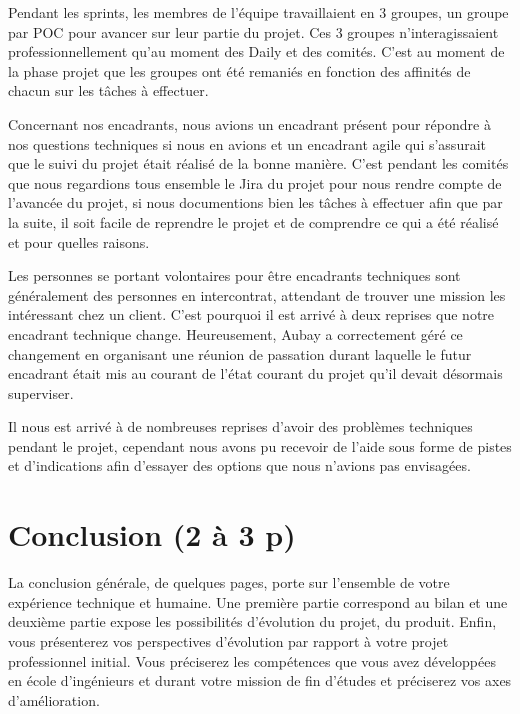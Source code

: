 \documentclass[11pt]{article}
\begin{document}
      Pendant les sprints, les membres de l'équipe travaillaient en 3 groupes, un groupe par POC pour avancer 
      sur leur partie du projet. Ces 3 groupes n'interagissaient professionnellement qu'au moment des Daily
      et des comités. C'est au moment de la phase projet que les groupes ont été remaniés en fonction des
      affinités de chacun sur les tâches à effectuer.

      Concernant nos encadrants, nous avions un encadrant présent pour répondre à nos questions 
      techniques si nous en avions et un encadrant agile qui s'assurait que le suivi du projet était réalisé 
      de la bonne manière. C'est pendant les comités que nous regardions tous ensemble le Jira du projet pour nous
      rendre compte de l'avancée du projet, si nous documentions bien les tâches à effectuer afin que par la suite, 
      il soit facile de reprendre le projet et de comprendre ce qui a été réalisé et pour quelles raisons.

      Les personnes se portant volontaires pour être encadrants techniques sont généralement des personnes en
      intercontrat, attendant de trouver une mission les intéressant chez un client. C'est pourquoi il est 
      arrivé à deux reprises que notre encadrant technique change. Heureusement, Aubay a correctement géré 
      ce changement en organisant une réunion de passation durant laquelle le futur encadrant était mis au 
      courant de l'état courant du projet qu'il devait désormais superviser.

      Il nous est arrivé à de nombreuses reprises d'avoir des problèmes techniques pendant le projet, cependant 
      nous avons pu recevoir de l'aide sous forme de pistes et d'indications afin d'essayer des options que 
      nous n'avions pas envisagées.

  \pagebreak
  \section{Conclusion (2 à 3 p)}
  La conclusion générale, de quelques pages, porte sur l’ensemble de votre expérience technique et
  humaine. Une première partie correspond au bilan et une deuxième partie expose les possibilités
  d’évolution du projet, du produit. Enfin, vous présenterez vos perspectives d’évolution par rapport à
  votre projet professionnel initial. Vous préciserez les compétences que vous avez développées en
  école d’ingénieurs et durant votre mission de fin d’études et préciserez vos axes d’amélioration.
\end{document}
